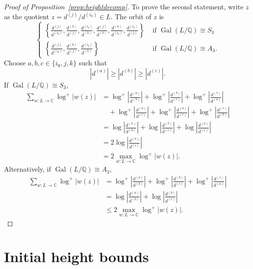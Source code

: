\documentclass[11pt]{report}
\theoremstyle{definition}
\DeclareMathOperator{\Gal}{Gal}
\begin{document}
\begin{proof}[Proof of Proposition~\ref{prop:heightdecomp}]
To prove the second statement, write $z$ as the quotient $z = d^{(j)}/d^{(i_0)} \in L$. The orbit of $z$ is
\[\begin{cases}
\left\{\frac{d^{(j)}}{d^{(i_0)}}, \frac{d^{(k)}}{d^{(j)}}, \frac{d^{(i_0)}}{d^{(k)}}, \frac{d^{(j)}}{d^{(k)}}, \frac{d^{(k)}}{d^{(i_0)}}, \frac{d^{(i_0)}}{d^{(j)}} \right\} & \text{ if } \Gal(L/\mathbb{Q}) \cong S_3\\
\left\{\frac{d^{(j)}}{d^{(i_0)}}, \frac{d^{(k)}}{d^{(j)}}, \frac{d^{(i_0)}}{d^{(k)}}\right\} & \text{ if } \Gal(L/\mathbb{Q}) \cong A_3.
\end{cases}\]
Choose $a,b,c\in\{i_0,j,k\}$ such that
\[|d^{(a)}| \geq |d^{(b)}| \geq |d^{(c)}|.\]
If $\Gal(L/\mathbb{Q}) \cong S_3$,
\begin{align*}
  \sum_{w:L \to \mathbb{C}} \log^+|w(z)|
  & = \log^+\left|\frac{d^{(a)}}{d^{(b)}}\right| + \log^+\left|\frac{d^{(b)}}{d^{(c)}}\right| +
    \log^+\left|\frac{d^{(c)}}{d^{(a)}}\right| \\
  & \quad +  \log^+\left|\frac{d^{(a)}}{d^{(c)}}\right| +
    \log^+\left|\frac{d^{(a)}}{d^{(c)}}\right| + \log^+\left|\frac{d^{(c)}}{d^{(b)}}\right|\\
  & = \log \left|\frac{d^{(a)}}{d^{(b)}}\right| + \log \left|\frac{d^{(b)}}{d^{(c)}}\right| +
    \log \left|\frac{d^{(a)}}{d^{(c)}}\right| \\
  & = 2\log \left|\frac{d^{(a)}}{d^{(c)}}\right|\\
  & = 2\max_{w:L \to \mathbb{C}} \log^+|w(z)|.
\end{align*}
Alternatively, if $\Gal(L/\mathbb{Q}) \cong A_3$,
\begin{align*}
  \sum_{w:L \to \mathbb{C}} \log^+|w(z)|
  & = \log^+\left|\frac{d^{(a)}}{d^{(b)}}\right| + \log^+\left|\frac{d^{(b)}}{d^{(c)}}\right| +
    \log^+\left|\frac{d^{(c)}}{d^{(a)}}\right| \\
  & = \log \left|\frac{d^{(a)}}{d^{(b)}}\right| + \log \left|\frac{d^{(b)}}{d^{(c)}}\right| \\
  & \leq 2\max_{w:L \to \mathbb{C}}  \log^+|w(z)|.
\end{align*}
\end{proof}


\section{Initial height bounds}
\label{sec:InitialHeightBounds}
\end{document}
